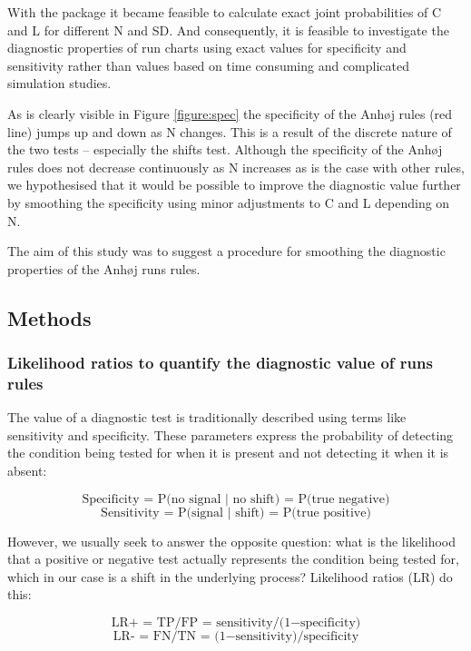 With the  package it became feasible to calculate
exact joint probabilities of C and L for different N and SD. And
consequently, it is feasible to investigate the diagnostic properties of
run charts using exact values for specificity and sensitivity rather
than values based on time consuming and complicated simulation studies.

As is clearly visible in Figure \ref{figure:spec} the specificity of the
Anhøj rules (red line) jumps up and down as N changes. This is a result
of the discrete nature of the two tests -- especially the shifts test.
Although the specificity of the Anhøj rules does not decrease
continuously as N increases as is the case with other rules, we
hypothesised that it would be possible to improve the diagnostic value
further by smoothing the specificity using minor adjustments to C and L
depending on N.

The aim of this study was to suggest a procedure for smoothing the
diagnostic properties of the Anhøj runs rules.

\hypertarget{methods}{%
\subsection{Methods}\label{methods}}

\hypertarget{likelihood-ratios-to-quantify-the-diagnostic-value-of-runs-rules}{%
\subsubsection{Likelihood ratios to quantify the diagnostic value of
runs
rules}\label{likelihood-ratios-to-quantify-the-diagnostic-value-of-runs-rules}}

The value of a diagnostic test is traditionally described using terms
like sensitivity and specificity. These parameters express the
probability of detecting the condition being tested for when it is
present and not detecting it when it is absent:

\[ \text{Specificity = P(no signal | no shift) = P(true negative}) \]
\[ \text{Sensitivity = P(signal | shift) = P(true positive}) \]

However, we usually seek to answer the opposite question: what is the
likelihood that a positive or negative test actually represents the
condition being tested for, which in our case is a shift in the
underlying process? Likelihood ratios (LR) do this:

\[ \text{LR+ = TP/FP = sensitivity/(1} - \text{specificity)} \]
\[ \text{LR- = FN/TN = (1} - \text{sensitivity)/specificity} \]

